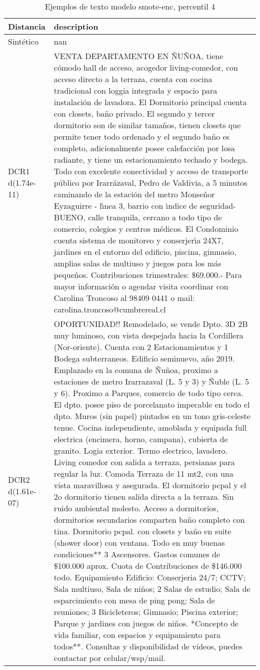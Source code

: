 \begin{table}[H]
\centering
\fontsize{10}{14}\selectfont
\caption{Ejemplos de texto modelo smote-enc, percentil 4}
\label{table-example-economicos-a-3-smote-enc-4p-text}
\begin{tabular}{|l|m{35em}|}
\hline
\rowcolor[gray]{0.8}
Distancia & description \\
\hline Sintético & nan \\
\hline DCR1 d(1.74e-11) & VENTA DEPARTAMENTO EN \~NU\~NOA, tiene c\'omodo hall de acceso, acogedor living-comedor, con acceso directo a la terraza, cuenta con cocina tradicional con loggia integrada y espacio para instalaci\'on de lavadora. El Dormitorio principal cuenta con closets, ba\~no privado. El segundo y tercer dormitorio son de similar tama\~nos, tienen closets que permite tener todo ordenado y el segundo ba\~no es completo, adicionalmente posee calefacci\'on por losa radiante, y tiene un estacionamiento techado y bodega. Todo con excelente conectividad y acceso de transporte p\'ublico por Irarr\'azaval, Pedro de Valdivia, a 5 minutos caminando de la estaci\'on del metro Monse\~nor Eyzaguirre - l{\'\i}nea 3, barrio con {\'\i}ndice de seguridad-BUENO, calle tranquila, cercano a todo tipo de comercio, colegios y centros m\'edicos. El Condominio cuenta sistema de monitoreo y conserjer{\'\i}a 24X7, jardines en el entorno del edificio, piscina, gimnasio, amplias salas de multiuso y juegos para los m\'as peque\~nos. Contribuciones trimestrales: \$69.000.-  Para mayor informaci\'on o agendar visita coordinar con Carolina Troncoso al 98409 0441 o mail: carolina.troncoso@cumbrereal.cl \\
\hline DCR2 d(1.61e-07) & OPORTUNIDAD!! Remodelado, se vende Dpto. 3D 2B muy luminoso, con vista despejada hacia la Cordillera (Nor-oriente). Cuenta con 2 Estacionamientos y 1 Bodega subterraneos. Edificio seminuevo, a\~no 2019. Emplazado en la comuna de \~Nu\~noa, proximo a estaciones de metro Irarrazaval (L. 5 y 3) y \~Nuble (L. 5 y 6). Proximo a Parques, comercio de todo tipo cerca.  El dpto. posee piso de porcelanato impecable en todo el dpto. Muros (sin papel) pintados en un tono gris-celeste tenue. Cocina independiente, amoblada y equipada full electrica (encimera, horno, campana), cubierta de granito. Logia exterior. Termo electrico, lavadero. Living comedor con salida a terraza, persianas para regular la luz. Comoda Terraza de 11 mt2, con una vista maravillosa y asegurada. El dormitorio pcpal y el 2o dormitorio tienen salida directa a la terraza. Sin ruido ambiental molesto. Acceso a dormitorios, dormitorios secundarios comparten ba\~no completo con tina.  Dormitorio pcpal. con closets y ba\~no en suite (shower door) con ventana. Todo en muy buenas condiciones** 3 Ascensores. Gastos comunes de \$100.000 aprox. Cuota de Contribuciones de \$146.000 todo. Equipamiento Edificio: Conserjeria 24/7; CCTV; Sala multiuso, Sala de ni\~nos; 2 Salas de estudio; Sala de esparcimiento con mesa de ping pong; Sala de reuniones; 3 Bicicleteros; Gimnasio; Piscina exterior; Parque y jardines con juegos de ni\~nos. *Concepto de vida familiar, con espacios y equipamiento para todos**. Consultas y disponibilidad de videos, puedes contactar por celular/wsp/mail. \\
\hline
\end{tabular}
\end{table}
